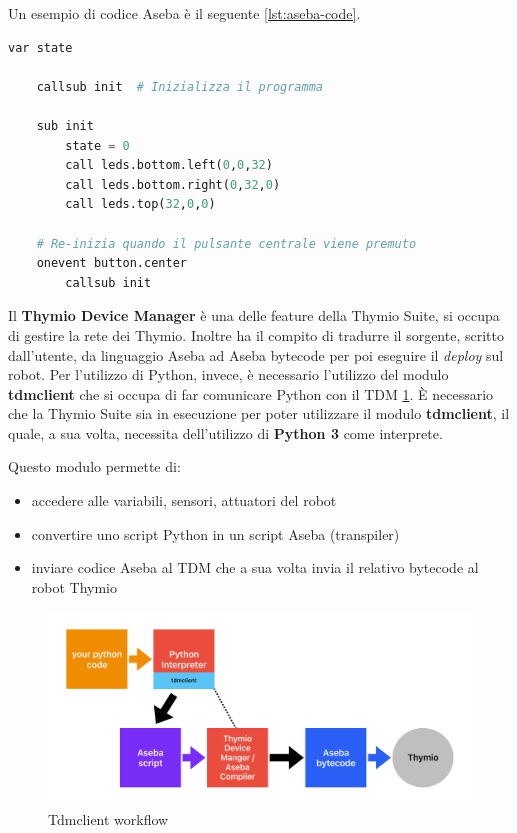 \documentclass[12pt,a4paper,openright,twoside]{book}
\begin{document}
Un esempio di codice Aseba è il seguente \cref{lst:aseba-code}.
\begin{lstlisting}[language=Python, label={lst:aseba-code}, caption={Esempio di codice Aseba con eventi}]
    var state

    callsub init  # Inizializza il programma

    sub init
        state = 0
        call leds.bottom.left(0,0,32)
        call leds.bottom.right(0,32,0)
        call leds.top(32,0,0)

    # Re-inizia quando il pulsante centrale viene premuto
    onevent button.center
        callsub init
\end{lstlisting}

Il \textbf{Thymio Device Manager} è una delle feature della Thymio Suite, si occupa di gestire la rete dei Thymio. Inoltre ha il compito di tradurre il sorgente, scritto dall'utente, da linguaggio Aseba ad Aseba bytecode per poi eseguire il \textit{deploy} sul robot. Per l'utilizzo di Python, invece, è necessario l'utilizzo del modulo \textbf{tdmclient} che si occupa di far comunicare Python con il \ac{TDM} \cref{fig:tdmclient}. È necessario che la Thymio Suite sia in esecuzione per poter utilizzare il modulo \textbf{tdmclient}, il quale, a sua volta, necessita dell'utilizzo di \textbf{Python 3} come interprete.

Questo modulo permette di:
\begin{itemize}
    \item accedere alle variabili, sensori, attuatori del robot
    \item convertire uno script Python in un script Aseba (transpiler)
    \item inviare codice Aseba al \ac{TDM} che a sua volta invia il relativo bytecode al  robot Thymio 
\end{itemize}

\begin{figure}
    \centering
    \includegraphics[width=.8\linewidth]{figures/TDM.pdf}
    \caption{Tdmclient workflow}
    \label{fig:tdmclient}
\end{figure}
\end{document}
